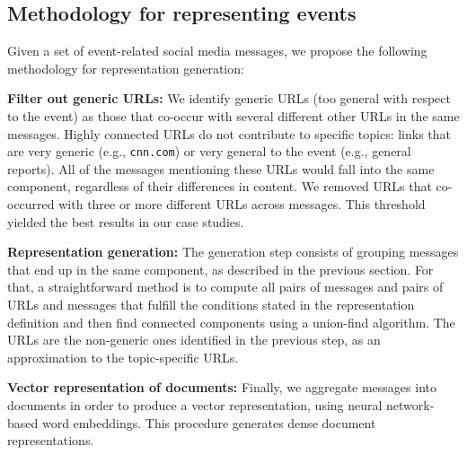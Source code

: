 \subsection*{Methodology for representing events}

Given a set of event-related social media messages, we propose the following
methodology for representation generation:
  
{\bf Filter out generic URLs:} 
%
We identify generic URLs (too general with respect to the event) as those that
co-occur with several different other URLs in the same messages. 
%
%
Highly connected URLs do not contribute to specific topics: links that are very
generic (e.g., {\tt cnn.com}) or very general to the event (e.g., general
reports). 
%
All of the messages mentioning these URLs would fall into the same component,
regardless of their differences in content. 
%
We removed URLs that co-occurred with three or more different URLs across
messages.
%
This threshold yielded the best results in our case studies.


{\bf Representation generation:} 
%
The generation step consists of grouping messages that end up in the same
component, as described in the previous section.
%
For that, a straightforward method is to compute all pairs of messages and pairs
of URLs and messages that fulfill the conditions stated in the representation
definition and then find connected components using a union-find algorithm.
%
The URLs are the non-generic ones identified in the previous step, as an
approximation to the topic-specific URLs.


{\bf Vector representation of documents:} 
%
Finally, we aggregate messages into documents in order to produce a vector
representation, using neural network-based word embeddings.
%
This procedure generates dense document representations.







